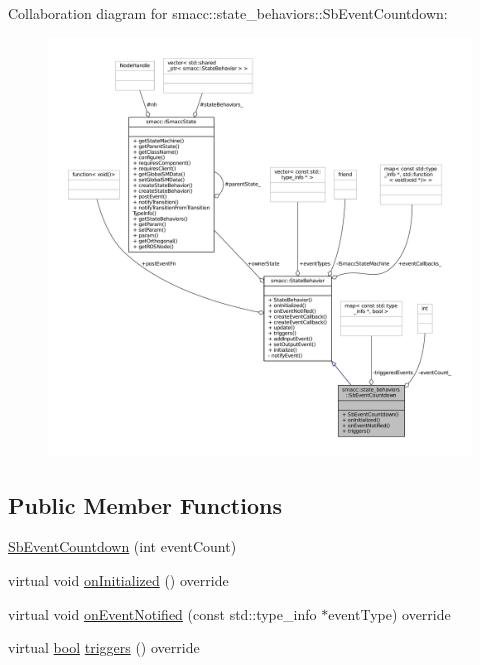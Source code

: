 Collaboration diagram for smacc\+:\+:state\+\_\+behaviors\+:\+:Sb\+Event\+Countdown\+:
\nopagebreak
\begin{figure}[H]
\begin{center}
\leavevmode
\includegraphics[width=350pt]{classsmacc_1_1state__behaviors_1_1SbEventCountdown__coll__graph}
\end{center}
\end{figure}
\subsection*{Public Member Functions}
\begin{DoxyCompactItemize}
\item 
\hyperlink{classsmacc_1_1state__behaviors_1_1SbEventCountdown_a4071d2a151a40287345f08a971a4850f}{Sb\+Event\+Countdown} (int event\+Count)
\item 
virtual void \hyperlink{classsmacc_1_1state__behaviors_1_1SbEventCountdown_ab7a785337b712a44e476d456d5bfc337}{on\+Initialized} () override
\item 
virtual void \hyperlink{classsmacc_1_1state__behaviors_1_1SbEventCountdown_a37eedf97f1080adc97d905811c623d49}{on\+Event\+Notified} (const std\+::type\+\_\+info $\ast$event\+Type) override
\item 
virtual \hyperlink{classbool}{bool} \hyperlink{classsmacc_1_1state__behaviors_1_1SbEventCountdown_ac7904390f6a5ede18bc44a1f82c6ee6e}{triggers} () override
\end{DoxyCompactItemize}
